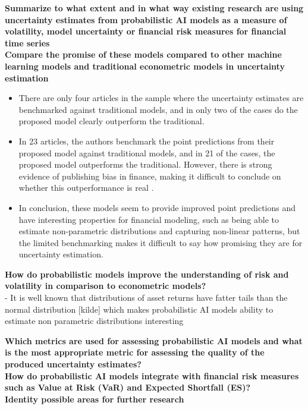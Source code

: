 \textbf{Summarize to what extent and in what way existing research are using uncertainty estimates from probabilistic AI models as a measure of volatility, model uncertainty or financial risk measures for financial time series}
\\ %

\textbf{Compare the promise of these models compared to other machine learning models and traditional econometric models in uncertainty estimation}
\\ %
\begin{itemize}

\item There are only four articles in the sample where the uncertainty estimates are benchmarked against traditional models, and in only two of the cases do the proposed model clearly outperform the traditional.

\item In 23 articles, the authors benchmark the point predictions from their proposed model against traditional models, and in 21 of the cases, the proposed model outperforms the traditional. However, there is strong evidence of publishing bias in finance, making it difficult to conclude on whether this outperformance is real \parencite{Kim2015SignificanceTI}.

\item In conclusion, these models seem to provide improved point predictions and have interesting properties for financial modeling, such as being able to estimate non-parametric distributions and capturing non-linear patterns, but the limited benchmarking makes it difficult to say how promising they are for uncertainty estimation.

\end{itemize}

\textbf{How do probabilistic models improve the understanding of risk and volatility in comparison to econometric models?}
\\ %
- It is well known that distributions of asset returns have fatter tails than the normal distribution [kilde] which makes probabilistic AI models ability to estimate non parametric distributions interesting

\textbf{Which metrics are used for assessing probabilistic AI models and what is the most appropriate metric for assessing the quality of the produced uncertainty estimates?}
\\ %

\textbf{How do probabilistic AI models integrate with financial risk measures such as Value at Risk (VaR) and Expected Shortfall (ES)?}
\\ %

\textbf{Identity possible areas for further research}
